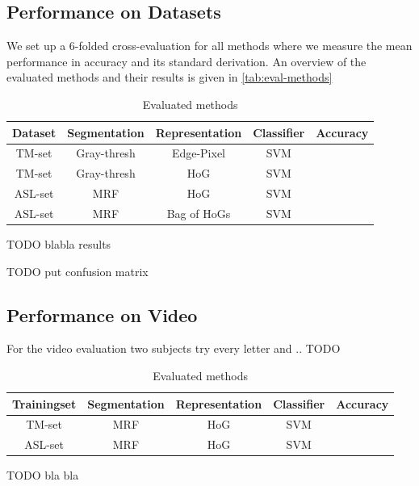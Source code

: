 \documentclass[letterpaper, 10 pt, conference]{ieeeconf}  %
\begin{document}
\subsection{Performance on Datasets}

We set up a 6-folded cross-evaluation for all methods where we measure the mean performance in accuracy and its standard derivation. An overview of the evaluated methods and their results is given in \autoref{tab:eval-methods}

\begin{table}[h]
\caption{Evaluated methods}
\label{tab:eval-methods}
\begin{center}
\begin{tabular}{c|c|c|c|c}
Dataset & Segmentation & Representation & Classifier & Accuracy \\
\hline
\hline
TM-set & Gray-thresh & Edge-Pixel & SVM &\\
TM-set & Gray-thresh & HoG & SVM &\\
ASL-set & MRF & HoG & SVM &\\
ASL-set & MRF & Bag of HoGs & SVM & \\
\hline
\end{tabular}
\end{center}
\end{table}

TODO blabla results

TODO put confusion matrix

\subsection{Performance on Video}

For the video evaluation two subjects try every letter and .. TODO

\begin{table}[h]
\caption{Evaluated methods}
\label{tab:eval-methods}
\begin{center}
\begin{tabular}{c|c|c|c|c}
Trainingset & Segmentation & Representation & Classifier & Accuracy \\
\hline
\hline
TM-set & MRF & HoG & SVM &\\
ASL-set & MRF & HoG & SVM &\\
\hline
\end{tabular}
\end{center}
\end{table}

TODO bla bla
\end{document}
